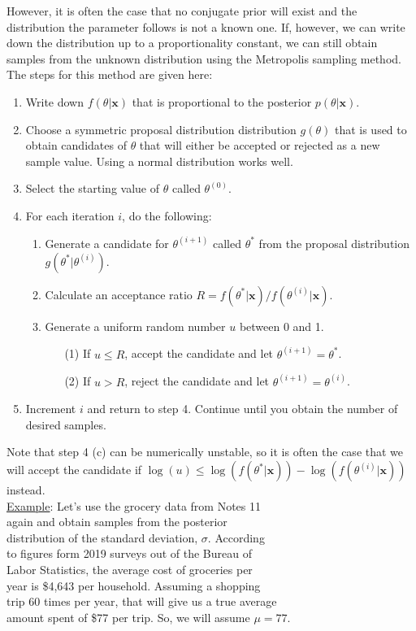 \documentclass[11pt]{article}
\begin{document}
However, it is often the case that no conjugate prior will exist and the distribution the parameter follows is not a known one. If, however, we can write down the distribution up to a proportionality constant, we can still obtain samples from the unknown distribution using the Metropolis sampling method. The steps for this method are given here: 
\begin{enumerate}
\item Write down $f(\theta|\boldsymbol{x})$ that is proportional to the posterior $p(\theta|\boldsymbol{x})$.
\item Choose a symmetric proposal distribution distribution $g(\theta)$ that is used to obtain candidates of $\theta$ that will either be accepted or rejected as a new sample value. Using a normal distribution works well.
\item Select the starting value of $\theta$ called $\theta^{(0)}$.
\item For each iteration $i$, do the following:
\begin{enumerate}
\item Generate a candidate for $\theta^{(i+1)}$ called $\theta^*$ from the proposal distribution $g(\theta^*|\theta^{(i)})$.
\item Calculate an acceptance ratio $R=f(\theta^*|\boldsymbol{x})/f(\theta^{(i)}|\boldsymbol{x})$.
\item Generate a uniform random number $u$ between 0 and 1.
\begin{enumerate}
\item[(1)] If $u\le R$, accept the candidate and let $\theta^{(i+1)}=\theta^*$.
\item[(2)] If $u>R$, reject the candidate and let $\theta^{(i+1)}=\theta^{(i)}$.
\end{enumerate}
\end{enumerate}
\item Increment $i$ and return to step 4. Continue until you obtain the number of desired samples.\\
\end{enumerate}

Note that step 4 (c) can be numerically unstable, so it is often the case that we will accept the candidate if $\log(u)\le \log\left(f(\theta^*|\boldsymbol{x})\right)-\log\left(f(\theta^{(i)}|\boldsymbol{x})\right)$ instead.\\

\underline{Example}: Let's use the grocery data from Notes 11\\
again and obtain samples from the posterior\\
distribution of the standard deviation, $\sigma$. According\\
to figures form 2019 surveys out of the Bureau of\\
Labor Statistics, the average cost of groceries per\\
year is \$4,643 per household. Assuming a shopping\\
trip 60 times per year, that will give us a true average\\
amount spent of \$77 per trip. So, we will assume $\mu=77$. 
\end{document}
